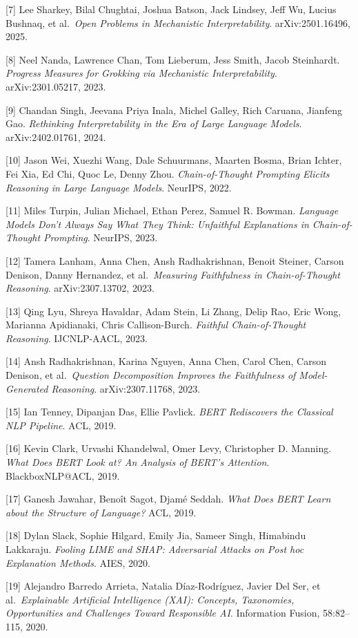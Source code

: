 {[}7{]} Lee Sharkey, Bilal Chughtai, Joshua Batson, Jack Lindsey, Jeff Wu, Lucius Bushnaq, et al.~\emph{Open Problems in Mechanistic Interpretability}. arXiv:2501.16496, 2025.

{[}8{]} Neel Nanda, Lawrence Chan, Tom Lieberum, Jess Smith, Jacob Steinhardt. \emph{Progress Measures for Grokking via Mechanistic Interpretability}. arXiv:2301.05217, 2023.

{[}9{]} Chandan Singh, Jeevana Priya Inala, Michel Galley, Rich Caruana, Jianfeng Gao. \emph{Rethinking Interpretability in the Era of Large Language Models}. arXiv:2402.01761, 2024.

{[}10{]} Jason Wei, Xuezhi Wang, Dale Schuurmans, Maarten Bosma, Brian Ichter, Fei Xia, Ed Chi, Quoc Le, Denny Zhou. \emph{Chain-of-Thought Prompting Elicits Reasoning in Large Language Models}. NeurIPS, 2022.

{[}11{]} Miles Turpin, Julian Michael, Ethan Perez, Samuel R. Bowman. \emph{Language Models Don't Always Say What They Think: Unfaithful Explanations in Chain-of-Thought Prompting}. NeurIPS, 2023.

{[}12{]} Tamera Lanham, Anna Chen, Ansh Radhakrishnan, Benoit Steiner, Carson Denison, Danny Hernandez, et al.~\emph{Measuring Faithfulness in Chain-of-Thought Reasoning}. arXiv:2307.13702, 2023.

{[}13{]} Qing Lyu, Shreya Havaldar, Adam Stein, Li Zhang, Delip Rao, Eric Wong, Marianna Apidianaki, Chris Callison-Burch. \emph{Faithful Chain-of-Thought Reasoning}. IJCNLP-AACL, 2023.

{[}14{]} Ansh Radhakrishnan, Karina Nguyen, Anna Chen, Carol Chen, Carson Denison, et al.~\emph{Question Decomposition Improves the Faithfulness of Model-Generated Reasoning}. arXiv:2307.11768, 2023.

{[}15{]} Ian Tenney, Dipanjan Das, Ellie Pavlick. \emph{BERT Rediscovers the Classical NLP Pipeline}. ACL, 2019.

{[}16{]} Kevin Clark, Urvashi Khandelwal, Omer Levy, Christopher D. Manning. \emph{What Does BERT Look at? An Analysis of BERT's Attention}. BlackboxNLP@ACL, 2019.

{[}17{]} Ganesh Jawahar, Benoît Sagot, Djamé Seddah. \emph{What Does BERT Learn about the Structure of Language?} ACL, 2019.

{[}18{]} Dylan Slack, Sophie Hilgard, Emily Jia, Sameer Singh, Himabindu Lakkaraju. \emph{Fooling LIME and SHAP: Adversarial Attacks on Post hoc Explanation Methods}. AIES, 2020.

{[}19{]} Alejandro Barredo Arrieta, Natalia Díaz-Rodríguez, Javier Del Ser, et al.~\emph{Explainable Artificial Intelligence (XAI): Concepts, Taxonomies, Opportunities and Challenges Toward Responsible AI}. Information Fusion, 58:82--115, 2020.

